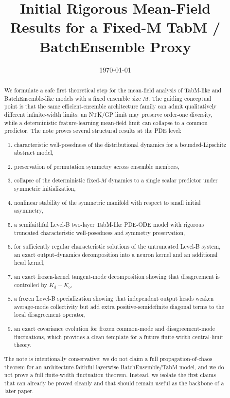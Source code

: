 \documentclass[11pt]{article}
\title{Initial Rigorous Mean-Field Results for a Fixed-M TabM / BatchEnsemble Proxy}
\author{}
\date{\today}
\theoremstyle{definition}
\begin{document}
\maketitle

\begin{abstract}
We formulate a safe first theoretical step for the mean-field analysis of TabM-like and
BatchEnsemble-like models with a fixed ensemble size $M$.
The guiding conceptual point is that the same efficient-ensemble architecture family can admit qualitatively different infinite-width limits:
an NTK/GP limit may preserve order-one diversity, while a deterministic feature-learning mean-field limit can collapse to a common predictor.
The note proves several structural results at the PDE level:
\begin{enumerate}[leftmargin=2em]
  \item characteristic well-posedness of the distributional dynamics for a bounded-Lipschitz abstract model,
  \item preservation of permutation symmetry across ensemble members,
  \item collapse of the deterministic fixed-$M$ dynamics to a single scalar predictor under symmetric initialization,
  \item nonlinear stability of the symmetric manifold with respect to small initial asymmetry,
  \item a semifaithful Level-B two-layer TabM-like PDE-ODE model with rigorous truncated characteristic well-posedness and symmetry preservation,
  \item for sufficiently regular characteristic solutions of the untruncated Level-B system, an exact output-dynamics decomposition into a neuron kernel and an additional head kernel,
  \item an exact frozen-kernel tangent-mode decomposition showing that disagreement is controlled by $K_{\mathrm d}-K_{\mathrm o}$,
  \item a frozen Level-B specialization showing that independent output heads weaken average-mode collectivity but add extra positive-semidefinite diagonal terms to the local disagreement operator,
  \item an exact covariance evolution for frozen common-mode and disagreement-mode fluctuations, which provides a clean template for a future finite-width central-limit theory.
\end{enumerate}
The note is intentionally conservative:
we do not claim a full propagation-of-chaos theorem for an architecture-faithful layerwise BatchEnsemble/TabM model,
and we do not prove a full finite-width fluctuation theorem.
Instead, we isolate the first claims that can already be proved cleanly and that should remain useful as the backbone of a later paper.
\end{abstract}
\end{document}
